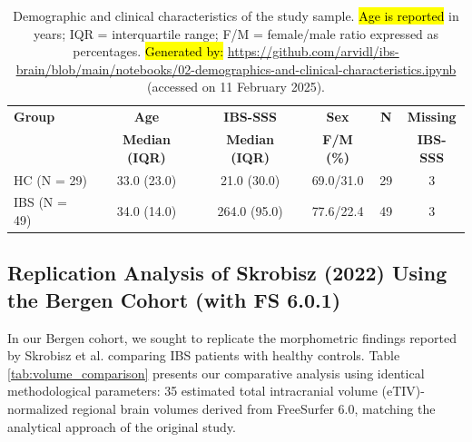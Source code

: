 \documentclass[diagnostics,article,accept,pdftex,moreauthors]{Definitions/mdpi}
\begin{document}
\begin{table}[H]

\caption{{Demographic and clinical characteristics of the study sample}. \hl{Age is reported} %
 in years; IQR = interquartile range; F/M = female/male ratio expressed as percentages. 
{\hl{Generated by:} {{\url{https://github.com/arvidl/ibs-brain/blob/main/notebooks/02-demographics-and-clinical-characteristics.ipynb}}} (accessed on 11 February 2025).}\label{tab:demographics}}

\begin{tabularx}{\textwidth}{LCCCCC}
\toprule

\textbf{Group} & \textbf{Age} & \textbf{IBS-SSS} & \textbf{Sex} & \textbf{N}  & \textbf{Missing}  \\
 & \textbf{Median (IQR)} & \textbf{Median (IQR)} & \textbf{F/M (\%)} &  & \textbf{IBS-SSS} \\
\midrule
HC (N = 29) & 33.0 (23.0) & 21.0 (30.0) & 69.0/31.0 & 29  & 3 \\
IBS (N = 49) & 34.0 (14.0) & 264.0 (95.0) & 77.6/22.4 & 49  & 3 \\
\bottomrule

\end{tabularx}


\end{table}

\subsection{Replication Analysis of Skrobisz (2022) Using the Bergen Cohort (with FS 6.0.1)}


In our Bergen cohort, we sought to replicate the morphometric findings reported by Skrobisz et al. \cite{Skrobisz2022} comparing IBS patients with healthy controls. Table \ref{tab:volume_comparison} presents our comparative analysis using identical methodological parameters: 35 estimated total intracranial volume (eTIV)-normalized regional brain volumes derived from FreeSurfer 6.0, matching the analytical approach of the original study.
\end{document}
